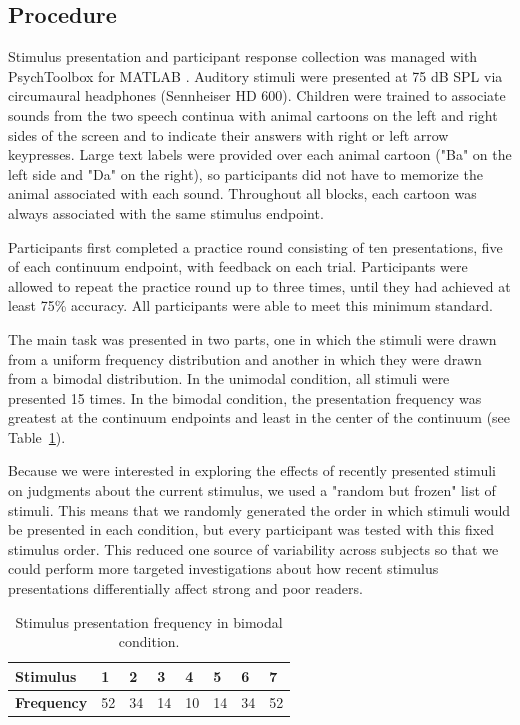 \documentclass[../uwthesis.tex]{subfiles}
\begin{document}
\subsection{Procedure}
Stimulus presentation and participant response collection was managed with PsychToolbox for MATLAB \citep{Brainard1997}. Auditory stimuli were presented at 75 dB SPL via circumaural headphones (Sennheiser HD 600). Children were trained to associate sounds from the two speech continua with animal cartoons on the left and right sides of the screen and to indicate their answers with right or left arrow keypresses. Large text labels were provided over each animal cartoon ("Ba" on the left side and "Da" on the right), so participants did not have to memorize the animal associated with each sound. Throughout all blocks, each cartoon was always associated with the same stimulus endpoint.

Participants first completed a practice round consisting of ten presentations, five of each continuum endpoint, with feedback on each trial. Participants were allowed to repeat the practice round up to three times, until they had achieved at least 75\% accuracy. All participants were able to meet this minimum standard.

The main task was presented in two parts, one in which the stimuli were drawn from a uniform frequency distribution and another in which they were drawn from a bimodal distribution. In the unimodal condition, all stimuli were presented 15 times. In the bimodal condition, the presentation frequency was greatest at the continuum endpoints and least in the center of the continuum (see Table~\ref{tab:stim_freq}).  

Because we were interested in exploring the effects of recently presented stimuli on judgments about the current stimulus, we used a "random but frozen" list of stimuli. This means that we randomly generated the order in which stimuli would be presented in each condition, but every participant was tested with this fixed stimulus order. This reduced one source of variability across subjects so that we could perform more targeted investigations about how recent stimulus presentations differentially affect strong and poor readers.

\begin{table}
    \caption{Stimulus presentation frequency in bimodal condition.}
    \label{tab:stim_freq}
    \centering
        \begin{tabular}{llllllll}
        \toprule
        \textbf{Stimulus} & 1 & 2 & 3 & 4 & 5 & 6 & 7\\
        \midrule
        \textbf{Frequency} & 52 & 34 & 14 & 10 & 14 & 34 & 52\\
        \bottomrule
        \end{tabular}
\end{table}
\end{document}
